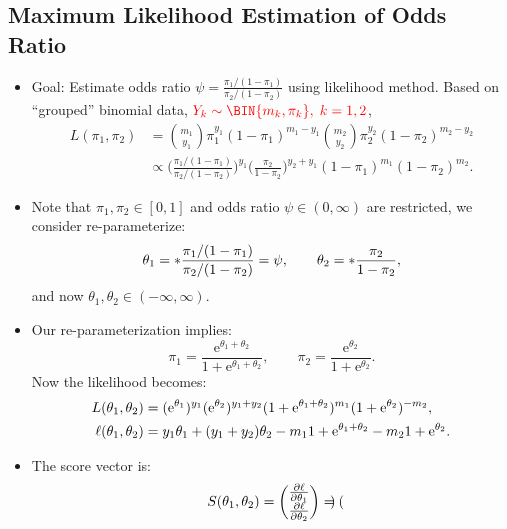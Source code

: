 \documentclass[oneside]{book}\usepackage[]{graphicx}\usepackage[svgnames]{xcolor}
\let\log\relax%
\begin{document}
\subsection*{Maximum Likelihood Estimation of Odds Ratio}
\begin{itemize}
      \item Goal: Estimate odds ratio $ \psi=\frac{\pi_1/(1-\pi_1)}{\pi_2/(1-\pi_2)} $ using likelihood method. Based
            on ``grouped'' binomial data, $ \textcolor{Red}{Y_k \sim \BIN{m_k,\pi_k},\; k=1,2} $,
            \begin{align*}
                  L(\pi_1,\pi_2)
                   & =\binom{m_1}{y_1}\pi_1^{y_1}(1-\pi_1)^{m_1-y_1}\binom{m_2}{y_2}\pi_2^{y_2}(1-\pi_2)^{m_2-y_2}                                                        \\
                   & \propto\biggl(\frac{\pi_1/(1-\pi_1)}{\pi_2/(1-\pi_2)} \biggr)^{\!y_1}\biggl(\frac{\pi_2}{1-\pi_2}\biggr)^{\! y_2+y_1}(1-\pi_1)^{m_1}(1-\pi_2)^{m_2}.
            \end{align*}
      \item Note that $ \pi_1,\pi_2\in[0,1] $ and odds ratio $ \psi\in(0,\infty) $ are restricted, we consider re-parameterize:
            \[ \theta_1=\log*{\frac{\pi_1/(1-\pi_1)}{\pi_2/(1-\pi_2)}}=\log{\psi},\qquad \theta_2=\log*{\frac{\pi_2}{1-\pi_2}}, \]
            and now $ \theta_1,\theta_2\in(-\infty,\infty) $.
      \item Our re-parameterization implies:
            \[ \pi_1=\frac{\mathrm{e}^{\theta_1+\theta_2}}{1+\mathrm{e}^{\theta_1+\theta_2}},\qquad \pi_2=\frac{\mathrm{e}^{\theta_2}}{1+\mathrm{e}^{\theta_2}}. \]
            Now the likelihood becomes:
            \begin{align*}
                  L(\theta_1,\theta_2)    & =(\mathrm{e}^{\theta_1})^{y_1}(\mathrm{e}^{\theta_2})^{y_1+y_2}(1+\mathrm{e}^{\theta_1+\theta_2})^{m_1}(1+\mathrm{e}^{\theta_2})^{-m_2}, \\
                  \ell(\theta_1,\theta_2) & =y_1\theta_1+(y_1+y_2)\theta_2-m_1\log{1+\mathrm{e}^{\theta_1+\theta_2}}-m_2\log{1+\mathrm{e}^{\theta_2}}.
            \end{align*}
      \item The score vector is:
            \[ S(\theta_1,\theta_2)=\begin{pmatrix}
                        \pdv{\ell}{\theta_1} \\
                        \pdv{\ell}{\theta_2}
                  \end{pmatrix}=\begin{pmatrix}

\end{pmatrix}\]
\end{itemize}
\end{document}
